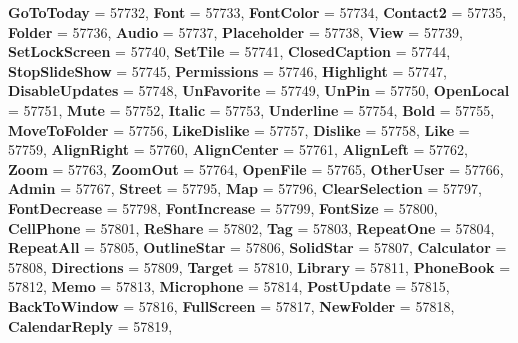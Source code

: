 \begin{DoxyCompactItemize}
{\bfseries Go\+To\+Today} = 57732, 
{\bfseries Font} = 57733, 
{\bfseries Font\+Color} = 57734, 
{\bfseries Contact2} = 57735, 
\newline
{\bfseries Folder} = 57736, 
{\bfseries Audio} = 57737, 
{\bfseries Placeholder} = 57738, 
{\bfseries View} = 57739, 
\newline
{\bfseries Set\+Lock\+Screen} = 57740, 
{\bfseries Set\+Tile} = 57741, 
{\bfseries Closed\+Caption} = 57744, 
{\bfseries Stop\+Slide\+Show} = 57745, 
\newline
{\bfseries Permissions} = 57746, 
{\bfseries Highlight} = 57747, 
{\bfseries Disable\+Updates} = 57748, 
{\bfseries Un\+Favorite} = 57749, 
\newline
{\bfseries Un\+Pin} = 57750, 
{\bfseries Open\+Local} = 57751, 
{\bfseries Mute} = 57752, 
{\bfseries Italic} = 57753, 
\newline
{\bfseries Underline} = 57754, 
{\bfseries Bold} = 57755, 
{\bfseries Move\+To\+Folder} = 57756, 
{\bfseries Like\+Dislike} = 57757, 
\newline
{\bfseries Dislike} = 57758, 
{\bfseries Like} = 57759, 
{\bfseries Align\+Right} = 57760, 
{\bfseries Align\+Center} = 57761, 
\newline
{\bfseries Align\+Left} = 57762, 
{\bfseries Zoom} = 57763, 
{\bfseries Zoom\+Out} = 57764, 
{\bfseries Open\+File} = 57765, 
\newline
{\bfseries Other\+User} = 57766, 
{\bfseries Admin} = 57767, 
{\bfseries Street} = 57795, 
{\bfseries Map} = 57796, 
\newline
{\bfseries Clear\+Selection} = 57797, 
{\bfseries Font\+Decrease} = 57798, 
{\bfseries Font\+Increase} = 57799, 
{\bfseries Font\+Size} = 57800, 
\newline
{\bfseries Cell\+Phone} = 57801, 
{\bfseries Re\+Share} = 57802, 
{\bfseries Tag} = 57803, 
{\bfseries Repeat\+One} = 57804, 
\newline
{\bfseries Repeat\+All} = 57805, 
{\bfseries Outline\+Star} = 57806, 
{\bfseries Solid\+Star} = 57807, 
{\bfseries Calculator} = 57808, 
\newline
{\bfseries Directions} = 57809, 
{\bfseries Target} = 57810, 
{\bfseries Library} = 57811, 
{\bfseries Phone\+Book} = 57812, 
\newline
{\bfseries Memo} = 57813, 
{\bfseries Microphone} = 57814, 
{\bfseries Post\+Update} = 57815, 
{\bfseries Back\+To\+Window} = 57816, 
\newline
{\bfseries Full\+Screen} = 57817, 
{\bfseries New\+Folder} = 57818, 
{\bfseries Calendar\+Reply} = 57819, 

\end{DoxyCompactItemize}
